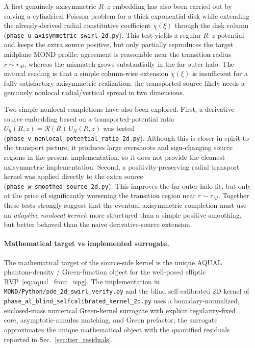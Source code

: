 \documentclass[11pt]{article}
\begin{document}
A first genuinely axisymmetric $R$--$z$ embedding has also been carried out by
solving a cylindrical Poisson problem for a thick exponential disk while
extending the already-derived radial constitutive coefficient $\chi(\xi)$
through the disk column (\texttt{phase\_u\_axisymmetric\_swirl\_2d.py}).  This
test yields a regular $R$--$z$ potential and keeps the extra source positive,
but only partially reproduces the target midplane MOND profile: agreement is
reasonable near the transition radius $r\sim r_M$, whereas the mismatch grows
substantially in the far outer halo.  The natural reading is that a simple
column-wise extension $\chi(\xi)$ is insufficient for a fully satisfactory
axisymmetric realization; the transported source likely needs a genuinely
nonlocal radial/vertical spread in two dimensions.

Two simple nonlocal completions have also been explored.  First, a
derivative-source embedding based on a transported-potential ratio
$U_h(R,z)=\mathcal R(R)\,U_N(R,z)$ was tested
(\nolinkurl{phase_v_nonlocal_potential_ratio_2d.py}).  Although this is
closer in spirit to the transport picture, it produces large overshoots and
sign-changing source regions in the present implementation, so it does not
provide the cleanest axisymmetric implementation.  Second, a positivity-preserving radial
transport kernel was applied directly to the extra source
(\nolinkurl{phase_w_smoothed_source_2d.py}).  This improves the far-outer-halo
fit, but only at the price of significantly worsening the transition region
near $r\sim r_M$.  Together these tests strongly suggest that the eventual
axisymmetric completion must use an \emph{adaptive nonlocal kernel}: more
structured than a simple positive smoothing, but better behaved than the naive
derivative-source extension.

\paragraph{Mathematical target vs implemented surrogate.}
The mathematical target of the source-side kernel is the unique AQUAL
phantom-density / Green-function object for the well-posed elliptic
BVP~\eqref{eq:aqual_from_ispg}.  The implementation in
\texttt{MOND/Python/pde\_2d\_swirl\_verify.py} and the blind
self-calibrated 2D kernel of
\texttt{phase\_al\_blind\_selfcalibrated\_kernel\_2d.py} uses a
boundary-normalized, enclosed-mass numerical Green-kernel surrogate
with explicit regularity-fixed core, asymptotic-annulus matching, and
Green prefactor; the surrogate approximates the unique mathematical
object with the quantified residuals reported in
Sec.~\ref{sec:tier_residuals}.
\end{document}

